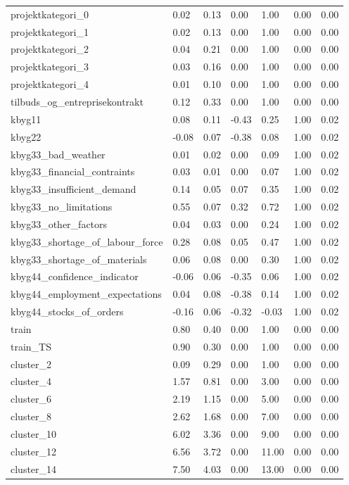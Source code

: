 \begin{landscape}
\begin{longtable}[h!]{lllllll}
projektkategori_0 & 0.02 & 0.13 & 0.00 & 1.00 & 0.00 & 0.00 \\
projektkategori_1 & 0.02 & 0.13 & 0.00 & 1.00 & 0.00 & 0.00 \\
projektkategori_2 & 0.04 & 0.21 & 0.00 & 1.00 & 0.00 & 0.00 \\
projektkategori_3 & 0.03 & 0.16 & 0.00 & 1.00 & 0.00 & 0.00 \\
projektkategori_4 & 0.01 & 0.10 & 0.00 & 1.00 & 0.00 & 0.00 \\
tilbuds_og_entreprisekontrakt & 0.12 & 0.33 & 0.00 & 1.00 & 0.00 & 0.00 \\
kbyg11 & 0.08 & 0.11 & -0.43 & 0.25 & 1.00 & 0.02 \\
kbyg22 & -0.08 & 0.07 & -0.38 & 0.08 & 1.00 & 0.02 \\
kbyg33_bad_weather & 0.01 & 0.02 & 0.00 & 0.09 & 1.00 & 0.02 \\
kbyg33_financial_contraints & 0.03 & 0.01 & 0.00 & 0.07 & 1.00 & 0.02 \\
kbyg33_insufficient_demand & 0.14 & 0.05 & 0.07 & 0.35 & 1.00 & 0.02 \\
kbyg33_no_limitations & 0.55 & 0.07 & 0.32 & 0.72 & 1.00 & 0.02 \\
kbyg33_other_factors & 0.04 & 0.03 & 0.00 & 0.24 & 1.00 & 0.02 \\
kbyg33_shortage_of_labour_force & 0.28 & 0.08 & 0.05 & 0.47 & 1.00 & 0.02 \\
kbyg33_shortage_of_materials & 0.06 & 0.08 & 0.00 & 0.30 & 1.00 & 0.02 \\
kbyg44_confidence_indicator & -0.06 & 0.06 & -0.35 & 0.06 & 1.00 & 0.02 \\
kbyg44_employment_expectations & 0.04 & 0.08 & -0.38 & 0.14 & 1.00 & 0.02 \\
kbyg44_stocks_of_orders & -0.16 & 0.06 & -0.32 & -0.03 & 1.00 & 0.02 \\
train & 0.80 & 0.40 & 0.00 & 1.00 & 0.00 & 0.00 \\
train_TS & 0.90 & 0.30 & 0.00 & 1.00 & 0.00 & 0.00 \\
cluster_2 & 0.09 & 0.29 & 0.00 & 1.00 & 0.00 & 0.00 \\
cluster_4 & 1.57 & 0.81 & 0.00 & 3.00 & 0.00 & 0.00 \\
cluster_6 & 2.19 & 1.15 & 0.00 & 5.00 & 0.00 & 0.00 \\
cluster_8 & 2.62 & 1.68 & 0.00 & 7.00 & 0.00 & 0.00 \\
cluster_10 & 6.02 & 3.36 & 0.00 & 9.00 & 0.00 & 0.00 \\
cluster_12 & 6.56 & 3.72 & 0.00 & 11.00 & 0.00 & 0.00 \\
cluster_14 & 7.50 & 4.03 & 0.00 & 13.00 & 0.00 & 0.00 \\
\end{longtable}\end{landscape}
